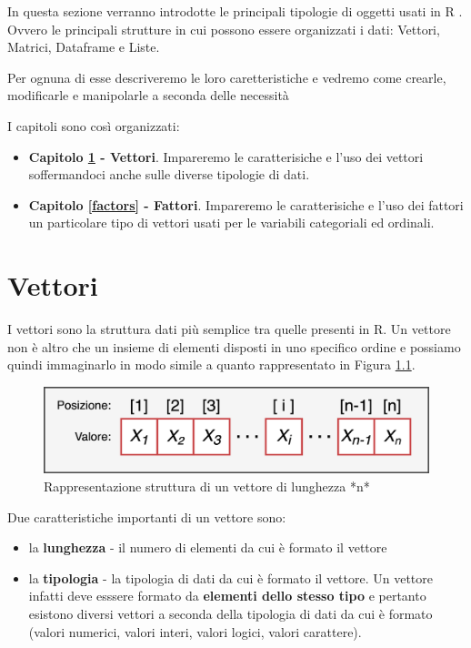 \documentclass[
]{book}
\providecommand{\tightlist}{%
  \setlength{\itemsep}{0pt}\setlength{\parskip}{0pt}}
\begin{document}
In questa sezione verranno introdotte le principali tipologie di oggetti usati in R . Ovvero le principali strutture in cui possono essere organizzati i dati: Vettori, Matrici, Dataframe e Liste.

Per ognuna di esse descriveremo le loro caretteristiche e vedremo come crearle, modificarle e manipolarle a seconda delle necessità

I capitoli sono così organizzati:

\begin{itemize}
\tightlist
\item
  \textbf{Capitolo \ref{vector} - Vettori}. Impareremo le caratterisiche e l'uso dei vettori soffermandoci anche sulle diverse tipologie di dati.
\item
  \textbf{Capitolo \ref{factors} - Fattori}. Impareremo le caratterisiche e l'uso dei fattori un particolare tipo di vettori usati per le variabili categoriali ed ordinali.
\end{itemize}

\hypertarget{vector}{%
\chapter{Vettori}\label{vector}}

I vettori sono la struttura dati più semplice tra quelle presenti in R. Un vettore non è altro che un insieme di elementi disposti in uno specifico ordine e possiamo quindi immaginarlo in modo simile a quanto rappresentato in Figura \ref{fig:vector}.

\begin{figure}

{\centering \includegraphics[width=0.65\linewidth]{images/vector} 

}

\caption{Rappresentazione struttura di un vettore di lunghezza *n*}\label{fig:vector}
\end{figure}

Due caratteristiche importanti di un vettore sono:

\begin{itemize}
\tightlist
\item
  la \textbf{lunghezza} - il numero di elementi da cui è formato il vettore
\item
  la \textbf{tipologia} - la tipologia di dati da cui è formato il vettore. Un vettore infatti deve esssere formato da \textbf{elementi dello stesso tipo} e pertanto esistono diversi vettori a seconda della tipologia di dati da cui è formato (valori numerici, valori interi, valori logici, valori carattere).
\end{itemize}
\end{document}
